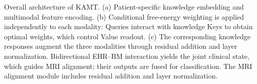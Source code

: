 \caption{Overall architecture of KAMT. (a) Patient-specific knowledge embedding and multimodal feature encoding. (b) Conditional free-energy weighting is applied independently to each modality: Queries interact with knowledge Keys to obtain optimal weights, which control Value readout. (c) The corresponding knowledge responses augment the three modalities through residual addition and layer normalization. Bidirectional EHR--BM interaction yields the joint clinical state, which guides MRI alignment; their outputs are fused for classification. The MRI alignment module includes residual addition and layer normalization.}
